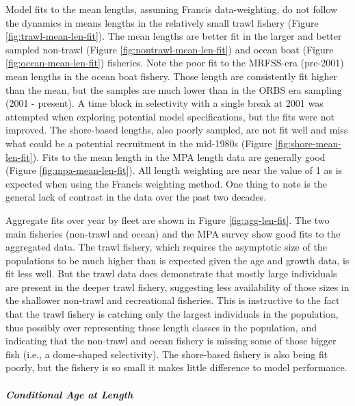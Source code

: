 \documentclass[11pt,
  english,
  letterpaper,
]{article}
\begin{document}
Model fits to the mean lengths, assuming Francis data-weighting, do not follow the dynamics in means lengths in the relatively small trawl fishery (Figure \ref{fig:trawl-mean-len-fit}). The mean lengths are better fit in the larger and better sampled non-trawl (Figure \ref{fig:nontrawl-mean-len-fit}) and ocean boat (Figure \ref{fig:ocean-mean-len-fit}) fisheries. Note the poor fit to the MRFSS-era (pre-2001) mean lengths in the ocean boat fishery. Those length are consistently fit higher than the mean, but the samples are much lower than in the ORBS era sampling (2001 - present). A time block in selectivity with a single break at 2001 was attempted when exploring potential model specifications, but the fits were not improved. The shore-based lengths, also poorly sampled, are not fit well and miss what could be a potential recruitment in the mid-1980s (Figure \ref{fig:shore-mean-len-fit}). Fits to the mean length in the MPA length data are generally good (Figure \ref{fig:mpa-mean-len-fit}). All length weighting are near the value of 1 as is expected when using the Francis weighting method. One thing to note is the general lack of contrast in the data over the past two decades.

Aggregate fits over year by fleet are shown in Figure \ref{fig:agg-len-fit}. The two main fisheries (non-trawl and ocean) and the MPA survey show good fits to the aggregated data. The trawl fishery, which requires the asymptotic size of the populations to be much higher than is expected given the age and growth data, is fit less well. But the trawl data does demonstrate that mostly large individuals are present in the deeper trawl fishery, suggesting less availability of those sizes in the shallower non-trawl and recreational fisheries. This is instructive to the fact that the trawl fishery is catching only the largest individuals in the population, thus possibly over representing those length classes in the population, and indicating that the non-trawl and ocean fishery is missing some of those bigger fish (i.e., a dome-shaped selectivity). The shore-based fishery is also being fit poorly, but the fishery is so small it makes little difference to model performance.

\hypertarget{conditional-age-at-length}{%
\subparagraph{Conditional Age at Length}\label{conditional-age-at-length}}
\end{document}
